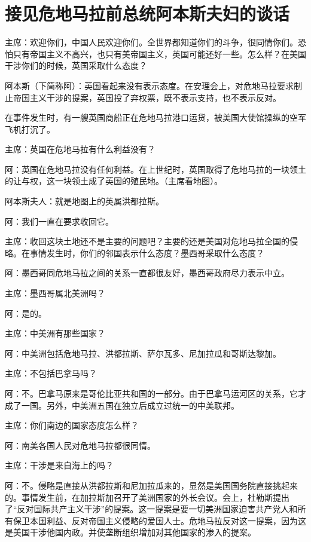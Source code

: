 \section[接见危地马拉前总统阿本斯夫妇的谈话（一九五六年七月十四日）]{接见危地马拉前总统阿本斯夫妇的谈话}


主席：欢迎你们，中国人民欢迎你们。全世界都知道你们的斗争，很同情你们。恐怕只有帝国主义不高兴，也只有美帝国主义，英国可能还好一些。怎么样？在美国干涉你们的时候，英国采取什么态度？

阿本斯（下简称阿）：英国看起来没有表示态度。在安理会上，对危地马拉要求制止帝国主义干涉的提案，英国投了弃权票，既不表示支持，也不表示反对。

在事件发生时，有一艘英国商船正在危地马拉港口运货，被美国大使馆操纵的空军飞机打沉了。

主席：英国在危地马拉有什么利益没有？

阿：英国在危地马拉没有任何利益。在上世纪时，英国取得了危地马拉的一块领土的让与权，这一块领土成了英国的殖民地。（主席看地图）。

阿本斯夫人：就是地图上的英属洪都拉斯。

阿：我们一直在要求收回它。

主席：收回这块土地还不是主要的问题吧？主要的还是美国对危地马拉全国的侵略。在事情发生时，你们的邻国表示什么态度？墨西哥采取什么态度？

阿：墨西哥同危地马拉之间的关系一直都很友好，墨西哥政府尽力表示中立。

主席：墨西哥属北美洲吗？

阿：是的。

主席：中美洲有那些国家？

阿：中美洲包括危地马拉、洪都拉斯、萨尔瓦多、尼加拉瓜和哥斯达黎加。

主席：不包括巴拿马吗？

阿：不。巴拿马原来是哥伦比亚共和国的一部分。由于巴拿马运河区的关系，它才成了一国。另外，中美洲五国在独立后成立过统一的中美联邦。

主席：你们南边的国家态度怎么样？

阿：南美各国人民对危地马拉都很同情。

主席：干涉是来自海上的吗？

阿：不。侵略是直接从洪都拉斯和尼加拉瓜来的，显然是美国国务院直接挑起来的。事情发生前，在加拉斯加召开了美洲国家的外长会议。会上，杜勒斯提出了“反对国际共产主义干涉”的提案。这一提案是要一切美洲国家迫害共产党人和所有保卫本国利益、反对帝国主义侵略的爱国人士。危地马拉反对这一提案，因为这是美国干涉他国内政。并使垄断组织增加对其他国家的渗入的提案。

